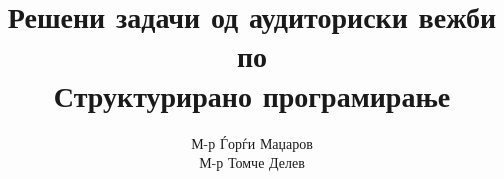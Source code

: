 \documentclass[11pt,twoside,a4paper]{article}
\title{Решени задачи од аудиториски вежби по\\ Структурирано програмирање}
\author{М-р Ѓорѓи Маџаров\\ М-р Томче Делев}
\begin{document}
\renewcommand*\contentsname{Содржина}
\maketitle
\newpage

\tableofcontents

\newpage
















\end{document}
